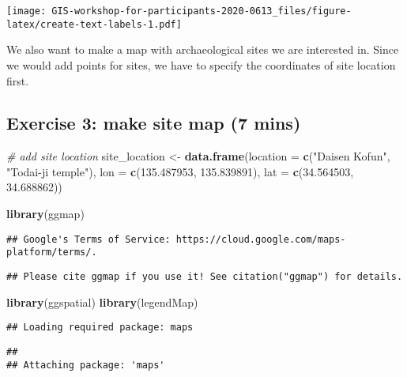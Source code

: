 \documentclass[
  xelatex,ja=standard]{bxjsarticle}
\newenvironment{Shaded}{\begin{snugshade}}{\end{snugshade}}
\newcommand{\CommentTok}[1]{\textcolor[rgb]{0.56,0.35,0.01}{\textit{#1}}}
\newcommand{\DataTypeTok}[1]{\textcolor[rgb]{0.13,0.29,0.53}{#1}}
\newcommand{\FloatTok}[1]{\textcolor[rgb]{0.00,0.00,0.81}{#1}}
\newcommand{\KeywordTok}[1]{\textcolor[rgb]{0.13,0.29,0.53}{\textbf{#1}}}
\newcommand{\NormalTok}[1]{#1}
\newcommand{\StringTok}[1]{\textcolor[rgb]{0.31,0.60,0.02}{#1}}
\begin{document}
\texttt{[image: GIS-workshop-for-participants-2020-0613\_files/figure-latex/create-text-labels-1.pdf]}

We also want to make a map with archaeological sites we are interested
in. Since we would add points for sites, we have to specify the
coordinates of site location first.

\hypertarget{exercise-3-make-site-map-7-mins}{%
\subsection{Exercise 3: make site map (7
mins)}\label{exercise-3-make-site-map-7-mins}}

\begin{Shaded}
\begin{Highlighting}[]
\CommentTok{# add site location}
\NormalTok{site_location <-}
\StringTok{  }\KeywordTok{data.frame}\NormalTok{(}\DataTypeTok{location =} \KeywordTok{c}\NormalTok{(}\StringTok{"Daisen Kofun"}\NormalTok{, }\StringTok{"Todai-ji temple"}\NormalTok{),}
             \DataTypeTok{lon =} \KeywordTok{c}\NormalTok{(}\FloatTok{135.487953}\NormalTok{, }\FloatTok{135.839891}\NormalTok{),}
             \DataTypeTok{lat =} \KeywordTok{c}\NormalTok{(}\FloatTok{34.564503}\NormalTok{, }\FloatTok{34.688862}\NormalTok{))}

\KeywordTok{library}\NormalTok{(ggmap)}
\end{Highlighting}
\end{Shaded}

\begin{verbatim}
## Google's Terms of Service: https://cloud.google.com/maps-platform/terms/.
\end{verbatim}

\begin{verbatim}
## Please cite ggmap if you use it! See citation("ggmap") for details.
\end{verbatim}

\begin{Shaded}
\begin{Highlighting}[]
\KeywordTok{library}\NormalTok{(ggspatial)}
\KeywordTok{library}\NormalTok{(legendMap)}
\end{Highlighting}
\end{Shaded}

\begin{verbatim}
## Loading required package: maps
\end{verbatim}

\begin{verbatim}
## 
## Attaching package: 'maps'
\end{verbatim}
\end{document}

